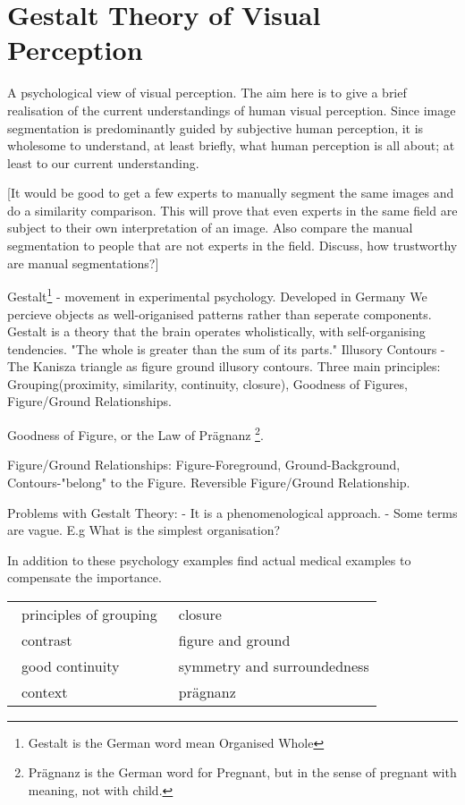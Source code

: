 \section{Gestalt Theory of Visual Perception}

A psychological view of visual perception. The aim here is to give a brief realisation of the current understandings of human visual perception. Since image segmentation is predominantly guided by subjective human perception, it is wholesome to understand, at least briefly, what human perception is all about; at least to our current understanding.

[It would be good to get a few experts to manually segment the same images and do a similarity comparison. This will prove that even experts in the same field are subject to their own interpretation of an image. Also compare the manual segmentation to people that are not experts in the field. Discuss, how trustworthy are manual segmentations?]

Gestalt\footnote{Gestalt is the German word mean Organised Whole} - movement in experimental psychology. Developed in Germany We percieve objects as well-origanised patterns rather than seperate components. Gestalt is a theory that the brain operates wholistically, with self-organising tendencies. "The whole is greater than the sum of its parts." Illusory Contours - The Kanisza triangle as figure ground illusory contours. Three main principles: Grouping(proximity, similarity, continuity, closure), Goodness of Figures, Figure/Ground Relationships.

Goodness of Figure, or the Law of Pr\"{a}gnanz \footnote{Pr\"{a}gnanz is the German word for Pregnant, but in the sense of pregnant with meaning, not with child.}. 

Figure/Ground Relationships: Figure-Foreground, Ground-Background, Contours-"belong" to the Figure. Reversible Figure/Ground Relationship.

Problems with Gestalt Theory: 
- It is a phenomenological approach.
- Some terms are vague. E.g What is the simplest organisation?

In addition to these psychology examples find actual medical examples to compensate the importance.

\begin{table}[h!]
	\centering
	\begin{tabular}{ll}
		\textbullet\, principles of grouping 		& \textbullet\, closure \\ 
		\textbullet\, contrast 		& \textbullet\, figure and ground \\ 
		\textbullet\, good continuity 	& \textbullet\, symmetry and surroundedness \\ 
		\textbullet\, context 		& \textbullet\, pr\"{a}gnanz \\ 
	\end{tabular} 
\end{table}

